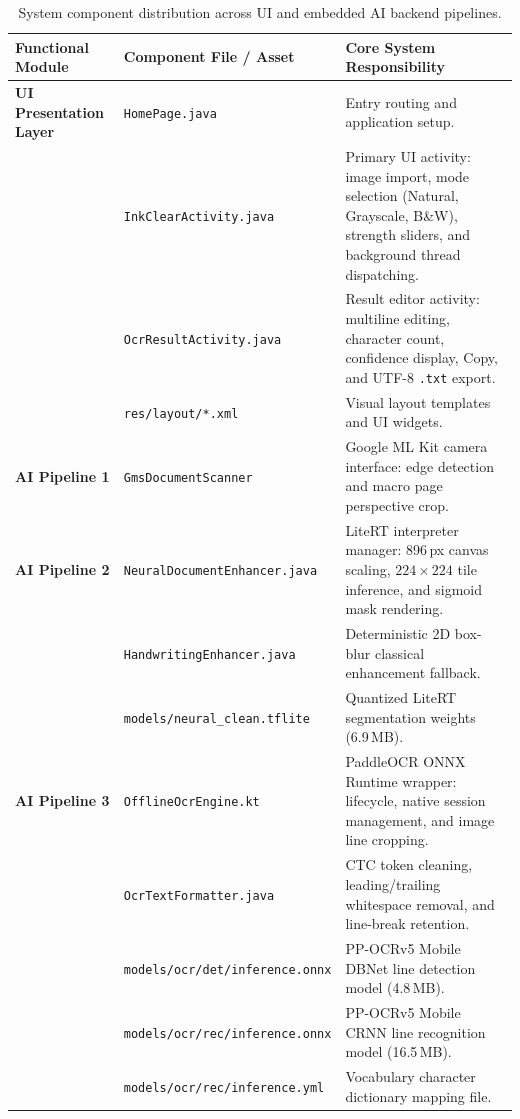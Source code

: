 \documentclass[11pt,a4paper]{article}
\begin{document}
\begin{table}[h]
\centering
\small
\begin{tabular}{lp{6.2cm}p{4.5cm}}
\toprule
\textbf{Functional Module} & \textbf{Component File / Asset} & \textbf{Core System Responsibility} \\
\midrule
\textbf{UI Presentation Layer} 
& \texttt{HomePage.java} & Entry routing and application setup. \\
& \texttt{InkClearActivity.java} & Primary UI activity: image import, mode selection (Natural, Grayscale, B\&W), strength sliders, and background thread dispatching. \\
& \texttt{OcrResultActivity.java} & Result editor activity: multiline editing, character count, confidence display, Copy, and UTF-8 \texttt{.txt} export. \\
& \texttt{res/layout/*.xml} & Visual layout templates and UI widgets. \\
\midrule
\textbf{AI Pipeline 1} 
& \texttt{GmsDocumentScanner} & Google ML Kit camera interface: edge detection and macro page perspective crop. \\
\midrule
\textbf{AI Pipeline 2} 
& \texttt{NeuralDocumentEnhancer.java} & LiteRT interpreter manager: 896\,px canvas scaling, $224\times 224$ tile inference, and sigmoid mask rendering. \\
& \texttt{HandwritingEnhancer.java} & Deterministic 2D box-blur classical enhancement fallback. \\
& \texttt{models/neural\_clean.tflite} & Quantized LiteRT segmentation weights (6.9\,MB). \\
\midrule
\textbf{AI Pipeline 3} 
& \texttt{OfflineOcrEngine.kt} & PaddleOCR ONNX Runtime wrapper: lifecycle, native session management, and image line cropping. \\
& \texttt{OcrTextFormatter.java} & CTC token cleaning, leading/trailing whitespace removal, and line-break retention. \\
& \texttt{models/ocr/det/inference.onnx} & PP-OCRv5 Mobile DBNet line detection model (4.8\,MB). \\
& \texttt{models/ocr/rec/inference.onnx} & PP-OCRv5 Mobile CRNN line recognition model (16.5\,MB). \\
& \texttt{models/ocr/rec/inference.yml} & Vocabulary character dictionary mapping file. \\
\bottomrule
\end{tabular}
\caption{System component distribution across UI and embedded AI backend pipelines.}
\label{tab:file-distribution}
\end{table}
\end{document}
